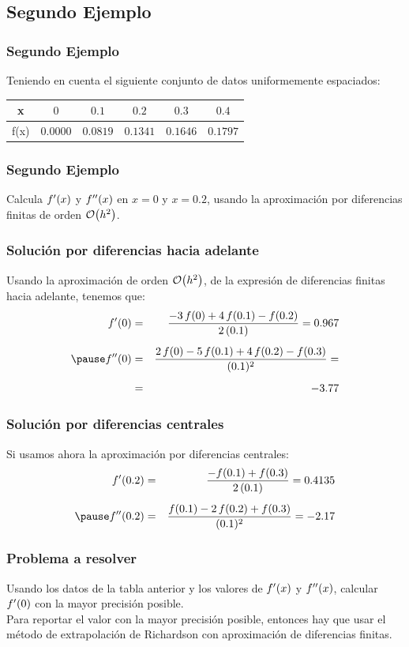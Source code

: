 \subsection*{Segundo Ejemplo}
\begin{frame}
\frametitle{Segundo Ejemplo}
Teniendo en cuenta el siguiente conjunto de datos uniformemente espaciados:
\begin{table}
\centering
\begin{tabular}{c | c | c | c | c | c }
x & $0$ & $0.1$ & $0.2$ & $0.3$ & $0.4$ \\ \hline
f(x) & $0.0000$ & $0.0819$ & $0.1341$ & $0.1646$ & $0.1797$
\end{tabular}
\end{table}
\end{frame}
\begin{frame}
\frametitle{Segundo Ejemplo}
Calcula ${f}^{\prime}(x)$ y ${f}^{\prime \prime}(x)$ en $x = 0$ y $x = 0.2$, usando la aproximación por diferencias finitas de orden $\order{h^{2}}$.
\end{frame}
\begin{frame}
\frametitle{Solución por diferencias hacia adelante}
Usando la aproximación de orden $\order{h^{2}}$, de la expresión de diferencias finitas hacia adelante, tenemos que:
\begin{eqnarray*}
\ptilde{f}(0) &=& \dfrac{-3 \, f(0) + 4 \, f(0.1) - f(0.2)}{2 \, (0.1)} = 0.967 \\[0.5em]
\pause
\stilde{f}(0) &=& \dfrac{2 \, f(0) - 5 \, f(0.1) + 4 \, f(0.2) - f(0.3)}{(0.1)^{2}} = \\[0.5em]
&=& -3.77
\end{eqnarray*}
\end{frame}
\begin{frame}
\frametitle{Solución por diferencias centrales}
Si usamos ahora la aproximación por diferencias centrales:
\begin{eqnarray*}
\ptilde{f}(0.2) &=& \dfrac{-f(0.1) + f(0.3)}{2 \, (0.1)} = 0.4135 \\[0.5em]
\pause
\stilde{f}(0.2) &=& \dfrac{f(0.1) - 2 \, f(0.2) + f(0.3)}{(0.1)^{2}} = -2.17
\end{eqnarray*}
\end{frame}
\begin{frame}
\frametitle{Problema a resolver}
Usando los datos de la tabla anterior y los valores de ${f}^{\prime}(x)$ y ${f}^{\prime \prime}(x)$, calcular ${f}^{\prime}(0)$ con la mayor precisión posible.
\\
\medskip
\pause
Para reportar el valor con la mayor precisión posible, entonces hay que usar el método de extrapolación de Richardson con aproximación de diferencias finitas.
\end{frame}
